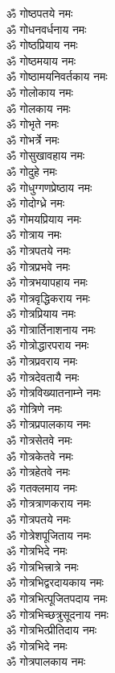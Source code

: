 \begin{multicols}{2}
\begin{flushleft}
ॐ गोष्ठपतये नमः\\
ॐ गोधनवर्धनाय नमः\\
ॐ गोष्ठप्रियाय नमः\\
ॐ गोष्ठमयाय नमः\\
ॐ गोष्ठामयनिवर्तकाय नमः\\
ॐ गोलोकाय नमः\\
ॐ गोलकाय नमः\\
ॐ गोभृते नमः\\
ॐ गोभर्त्रे नमः\hfill{}\\
ॐ गोसुखावहाय नमः\\
ॐ गोदुहे नमः\\
ॐ गोधुग्गणप्रेष्ठाय नमः\\
ॐ गोदोग्ध्रे नमः\\
ॐ गोमयप्रियाय नमः\\
ॐ गोत्राय नमः\\
ॐ गोत्रपतये नमः\\
ॐ गोत्रप्रभवे नमः\\
ॐ गोत्रभयापहाय नमः\\
ॐ गोत्रवृद्धिकराय नमः\hfill{}\\
ॐ गोत्रप्रियाय नमः\\
ॐ गोत्रार्तिनाशनाय नमः\\
ॐ गोत्रोद्धारपराय नमः\\
ॐ गोत्रप्रवराय नमः\\
ॐ गोत्रदेवतायै नमः\\
ॐ गोत्रविख्यातनाम्ने नमः\\
ॐ गोत्रिणे नमः\\
ॐ गोत्रप्रपालकाय नमः\\
ॐ गोत्रसेतवे नमः\\
ॐ गोत्रकेतवे नमः\hfill{}\\
ॐ गोत्रहेतवे नमः\\
ॐ गतक्लमाय नमः\\
ॐ गोत्रत्राणकराय नमः\\
ॐ गोत्रपतये नमः\\
ॐ गोत्रेशपूजिताय नमः\\
ॐ गोत्रभिदे नमः\\
ॐ गोत्रभित्त्रात्रे नमः\\
ॐ गोत्रभिद्वरदायकाय नमः\\
ॐ गोत्रभित्पूजितपदाय नमः\\
ॐ गोत्रभिच्छत्रुसूदनाय नमः\hfill{}\\
ॐ गोत्रभित्प्रीतिदाय नमः\\
ॐ गोत्रभिदे नमः\\
ॐ गोत्रपालकाय नमः\\

\end{flushleft}
\end{multicols}
